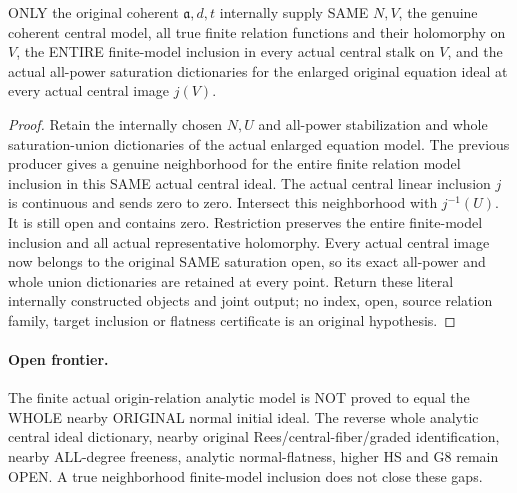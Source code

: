 \begin{theorem}
\label{hir:relative-normal-deformation-original-finite-spread}
\leanok
{}
ONLY the original coherent $\mathfrak a,d,t$ internally supply SAME $N,V$,
the genuine coherent central model, all true finite relation functions and
their holomorphy on $V$, the ENTIRE finite-model inclusion in every actual
central stalk on $V$, and the actual all-power saturation dictionaries for
the enlarged original equation ideal at every actual central image $j(V)$.
\end{theorem}
\begin{proof}
Retain the internally chosen $N,U$ and all-power stabilization and whole
saturation-union dictionaries of the actual enlarged equation model. The
previous producer gives a genuine neighborhood for the entire finite relation
model inclusion in this SAME actual central ideal. The actual central linear
inclusion $j$ is continuous and sends zero to zero. Intersect this neighborhood
with $j^{-1}(U)$. It is still open and contains zero. Restriction preserves
the entire finite-model inclusion and all actual representative holomorphy.
Every actual central image now belongs to the original SAME saturation open,
so its exact all-power and whole union dictionaries are retained at every
point. Return these literal internally constructed objects and joint output;
no index, open, source relation family, target inclusion or flatness certificate
is an original hypothesis.
\end{proof}

\paragraph{Open frontier.}
The finite actual origin-relation analytic model is NOT proved to equal the
WHOLE nearby ORIGINAL normal initial ideal. The reverse whole analytic central
ideal dictionary, nearby original Rees/central-fiber/graded identification,
nearby ALL-degree freeness, analytic normal-flatness, higher HS and G8 remain
OPEN. A true neighborhood finite-model inclusion does not close these gaps.
